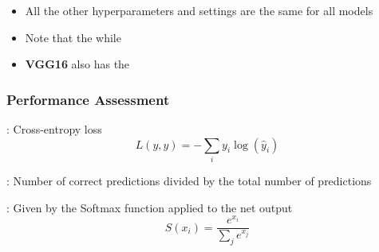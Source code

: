 \documentclass[../presentation.tex]{subfiles} %
\begin{document}
\begin{frame}[t]
    \vspace{-0.3cm}
    \begin{cbox}
        \begin{itemize}
            \item All the other hyperparameters and settings are the same for
							all models 
            \item Note that the  while 
            \item \textbf{VGG16} also has the \mbox{}
        \end{itemize}
    \end{cbox}

\end{frame}

\begin{frame}
    \frametitle{Performance Assessment}


		\begin{cbox}
			: Cross-entropy loss 
			\begin{equation*}
				L(y, \hat{y}) = -\sum_{i} y_i \log(\hat{y}_i)
			\end{equation*}
		\end{cbox}

		\begin{cbox}
			: Number of correct predictions divided by the total number of predictions
		\end{cbox}

		\begin{cbox}
			: Given by the Softmax function applied to the net output
			\begin{equation*}
				S(x_i) = \frac{e^{x_i}}{\sum_{j} e^{x_j}}
			\end{equation*}
		\end{cbox}

\end{frame}
\end{document}

